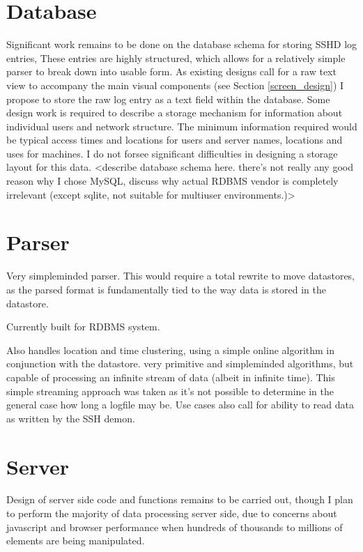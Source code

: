 \section{Database}
Significant work remains to be done on the database schema for storing SSHD log entries, These entries are highly structured, which allows for a relatively simple parser to break down into usable form. As existing designs call for a raw text view to accompany the main visual components (see Section \ref{screen_design}) I propose to store the raw log entry as a text field  within the database. Some design work is required to describe a storage mechanism for information about individual users and network structure. The minimum information required would be typical access times and locations for users and server names, locations and uses for machines. I do not forsee significant difficulties in designing a storage layout for this data.
<describe database schema here. there's not really any good reason why I chose MySQL, discuss why actual RDBMS vendor is completely irrelevant (except sqlite, not suitable for multiuser environments.)>

\section{Parser}

Very simpleminded parser. This would require a total rewrite to move datastores, as the parsed format is fundamentally tied to the way data is stored in the datastore. 

Currently built for RDBMS system.

Also handles location and time clustering, using a simple online algorithm in conjunction with the datastore. very primitive and simpleminded algorithms, but capable of processing an infinite stream of data (albeit in infinite time). This simple streaming approach was taken as it's not possible to determine in the general case how long a logfile may be. Use cases also call for ability to read data as written by the SSH demon. 

\section{Server}

Design of server side code and functions remains to be carried out, though I plan to perform the majority of data processing server side, due to concerns about javascript and browser performance when hundreds of thousands to millions of elements are being manipulated. 

